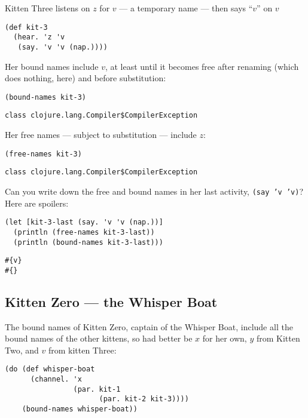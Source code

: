 \documentclass[10pt,oneside,x11names]{article}
\theoremstyle{definition}
\theoremstyle{warning}
\begin{document}
Kitten Three listens on \(z\) for \(v\) --- a temporary name --- then
says ``\(v\)'' on \(v\)

\vskip 0.26cm
\begin{verbatim}
(def kit-3
  (hear. 'z 'v
   (say. 'v 'v (nap.))))
\end{verbatim}

Her bound names include \(v\), at least until it becomes free after
renaming (which does nothing, here) and before substitution:

\vskip 0.26cm
\begin{verbatim}
(bound-names kit-3)
\end{verbatim}

\begin{verbatim}
class clojure.lang.Compiler$CompilerException
\end{verbatim}


Her free names --- subject to substitution --- include \(z\):

\vskip 0.26cm
\begin{verbatim}
(free-names kit-3)
\end{verbatim}

\begin{verbatim}
class clojure.lang.Compiler$CompilerException
\end{verbatim}


Can you write down the free and bound names in her last activity,
\texttt{(say 'v 'v)}? Here are spoilers:

\vskip 0.26cm
\begin{verbatim}
(let [kit-3-last (say. 'v 'v (nap.))]
  (println (free-names kit-3-last))
  (println (bound-names kit-3-last)))
\end{verbatim}

\begin{verbatim}
#{v}
#{}
\end{verbatim}

\subsection{Kitten Zero --- the Whisper Boat}
\label{sec:org08d970e}

The bound names of Kitten Zero, captain of the Whisper Boat,
include all the bound names of the other kittens, so had better be
\(x\) for her own, \(y\) from Kitten Two, and \(v\) from kitten Three:

\vskip 0.26cm
\begin{verbatim}
(do (def whisper-boat
      (channel. 'x
                (par. kit-1
                      (par. kit-2 kit-3))))
    (bound-names whisper-boat))
\end{verbatim}
\end{document}
